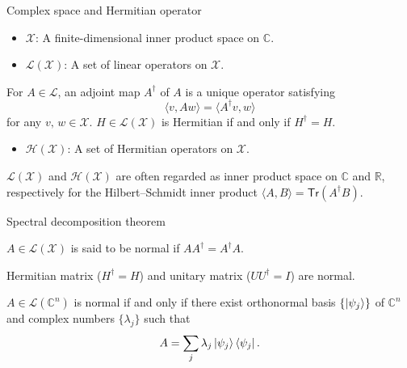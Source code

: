 \documentclass{beamer}
\newcommand{\Tr}{\mathsf{Tr}}
\newcommand\emm[1]{\textcolor{redorange}{{#1}}}
\begin{document}
\begin{frame}{Complex space and Hermitian operator}
\begin{itemize}
\item $\mathcal{X}$: A finite-dimensional inner product space on $\mathbb{C}$.
\item $\mathcal{L}(\mathcal{X})$: A set of linear operators on $\mathcal{X}$.
\end{itemize}

\vspace{1em}
For $A\in\mathcal{L}$, an adjoint map $A^\dagger$ of $A$ is a unique operator satisfying
\begin{equation*}
\langle v, Aw\rangle = \langle A^\dagger v, w\rangle
\end{equation*}
for any $v,\,w\in\mathcal{X}$.
$H\in\mathcal{L}(\mathcal{X})$ is Hermitian if and only if $H^\dagger = H$.

\vspace{1em}
\begin{itemize}
\item $\mathcal{H}(\mathcal{X})$: A set of Hermitian operators on $\mathcal{X}$.
\end{itemize}

\vspace{2em}
$\mathcal{L}(\mathcal{X})$ and $\mathcal{H}(\mathcal{X})$ are often regarded as inner product space on $\mathbb{C}$ and $\mathbb{R}$, respectively
for the Hilbert--Schmidt inner product $\langle A, B\rangle = \Tr(A^\dagger B)$.
\end{frame}

\begin{frame}{Spectral decomposition theorem}
\begin{definition}
$A\in\mathcal{L}(\mathcal{X})$ is said to be \emm{normal} if $AA^\dagger = A^\dagger A$.
\end{definition}

\vspace{1em}
Hermitian matrix ($H^\dagger = H$) and unitary matrix ($UU^\dagger = I$) are normal.

\vspace{2em}
\begin{theorem}
$A\in \mathcal{L}(\mathbb{C}^n)$ is \emm{normal} if and only if there exist orthonormal basis $\{\ket{\psi_j}\}$ of $\mathbb{C}^n$ and complex numbers $\{\lambda_j\}$ such that
\begin{equation*}
A=\sum_j \lambda_j\ket{\psi_j}\bra{\psi_j}.
\end{equation*}
\end{theorem}
\end{frame}
\end{document}
